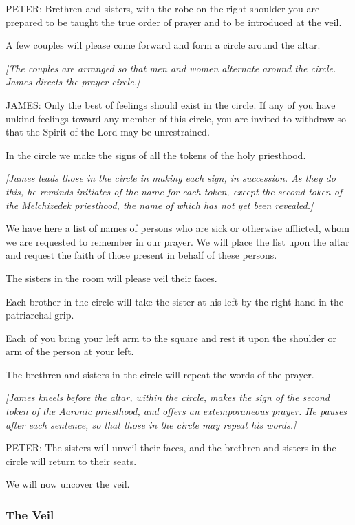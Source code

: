 				PETER: Brethren and sisters, with the robe on the right shoulder you are prepared to be taught the true order of prayer and to be introduced at the veil.

				A few couples will please come forward and form a circle around the altar.

				\textit{[The couples are arranged so that men and women alternate around the circle. James directs the prayer circle.]}

				JAMES: Only the best of feelings should exist in the circle. If any of you have unkind feelings toward any member of this circle, you are invited to withdraw so that the Spirit of the Lord may be unrestrained.

				In the circle we make the signs of all the tokens of the holy priesthood.

				\textit{[James leads those in the circle in making each sign, in succession. As they do this, he reminds initiates of the name for each token, except the second token of the Melchizedek priesthood, the name of which has not yet been revealed.]}

				We have here a list of names of persons who are sick or otherwise afflicted, whom we are requested to remember in our prayer. We will place the list upon the altar and request the faith of those present in behalf of these persons.

				The sisters in the room will please veil their faces.

				Each brother in the circle will take the sister at his left by the right hand in the patriarchal grip.

				Each of you bring your left arm to the square and rest it upon the shoulder or arm of the person at your left.

				The brethren and sisters in the circle will repeat the words of the prayer.

				\textit{[James kneels before the altar, within the circle, makes the sign of the second token of the Aaronic priesthood, and offers an extemporaneous prayer. He pauses after each sentence, so that those in the circle may repeat his words.]}

				PETER: The sisters will unveil their faces, and the brethren and sisters in the circle will return to their seats.

				We will now uncover the veil.
				
		\subsubsection{The Veil}
			\label{TEMPLE-ENDOWMENT-ENDOW-PRE-1990-VEIL}
			
